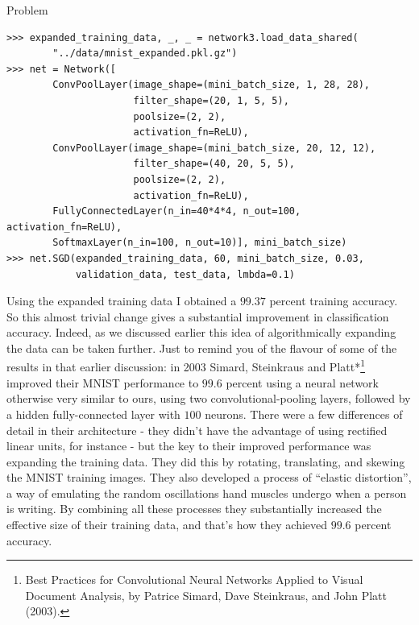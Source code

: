 \begin{exerciseBox}{Problem}
\begin{lstlisting}
>>> expanded_training_data, _, _ = network3.load_data_shared(
        "../data/mnist_expanded.pkl.gz")
>>> net = Network([
        ConvPoolLayer(image_shape=(mini_batch_size, 1, 28, 28), 
                      filter_shape=(20, 1, 5, 5), 
                      poolsize=(2, 2), 
                      activation_fn=ReLU),
        ConvPoolLayer(image_shape=(mini_batch_size, 20, 12, 12), 
                      filter_shape=(40, 20, 5, 5), 
                      poolsize=(2, 2), 
                      activation_fn=ReLU),
        FullyConnectedLayer(n_in=40*4*4, n_out=100, activation_fn=ReLU),
        SoftmaxLayer(n_in=100, n_out=10)], mini_batch_size)
>>> net.SGD(expanded_training_data, 60, mini_batch_size, 0.03, 
            validation_data, test_data, lmbda=0.1)

\end{lstlisting}


Using the expanded training data I obtained a $99.37$ percent training accuracy. So this almost trivial change gives a substantial improvement in classification accuracy. Indeed, as we discussed earlier this idea of algorithmically expanding the data can be taken further. Just to remind you of the flavour of some of the results in that earlier discussion: in 2003 Simard, Steinkraus and Platt*\footnote{Best Practices for Convolutional Neural Networks Applied to Visual Document Analysis, by Patrice Simard, Dave Steinkraus, and John Platt (2003).} improved their MNIST performance to $99.6$ percent using a neural network otherwise very similar to ours, using two convolutional-pooling layers, followed by a hidden fully-connected layer with $100$ neurons. There were a few differences of detail in their architecture - they didn't have the advantage of using rectified linear units, for instance - but the key to their improved performance was expanding the training data. They did this by rotating, translating, and skewing the MNIST training images. They also developed a process of ``elastic distortion'', a way of emulating the random oscillations hand muscles undergo when a person is writing. By combining all these processes they substantially increased the effective size of their training data, and that's how they achieved $99.6$ percent accuracy.

\end{exerciseBox}



